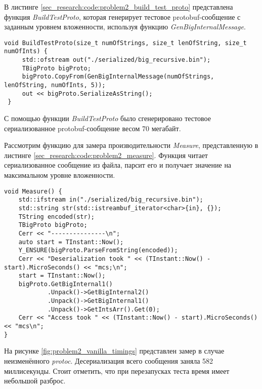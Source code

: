 В листинге \ref{sec_research:code:problem2_build_test_proto} представлена функция \textit{BuildTestProto}, которая генерирует тестовое protobuf-сообщение с заданным уровнем вложенности, используя функцию \textit{GenBigInternalMessage}.

\noindent\begin{minipage}{\linewidth}
\begin{lstlisting}[style=CodeListing, caption={Функция BuildTestProto}, label=sec_research:code:problem2_build_test_proto]
 void BuildTestProto(size_t numOfStrings, size_t lenOfString, size_t numOfInts) {
     std::ofstream out("./serialized/big_recursive.bin");
     TBigProto bigProto;
     bigProto.CopyFrom(GenBigInternalMessage(numOfStrings, lenOfString, numOfInts, 5));
     out << bigProto.SerializeAsString();
 }
\end{lstlisting}
\end{minipage}

С помощью функции \textit{BuildTestProto} было сгенерировано тестовое сериализованное protobuf-сообщение весом 70 мегабайт.

Рассмотрим функцию для замера производительности \textit{Measure}, представленную в листинге \ref{sec_research:code:problem2_measure}.
Функция читает сериализованное сообщение из файла, парсит его и получает значение на максимальном уровне вложенности.

\noindent\begin{minipage}{\linewidth}
\begin{lstlisting}[style=CodeListing, caption={Функция Measure}, label=sec_research:code:problem2_measure]
void Measure() {
    std::ifstream in("./serialized/big_recursive.bin");
    std::string str(std::istreambuf_iterator<char>{in}, {});
    TString encoded(str);
    TBigProto bigProto;
    Cerr << "---------------\n";
    auto start = TInstant::Now();
    Y_ENSURE(bigProto.ParseFromString(encoded));
    Cerr << "Deserialization took " << (TInstant::Now() - start).MicroSeconds() << "mcs;\n";
    start = TInstant::Now();
    bigProto.GetBigInternal1()
            .Unpack()->GetBigInternal2()
            .Unpack()->GetBigInternal1()
            .Unpack()->GetIntsArr().Get(0);
    Cerr << "Access took " << (TInstant::Now() - start).MicroSeconds() << "mcs\n";
}
\end{lstlisting}
\end{minipage}

На рисунке \ref{fig:problem2_vanilla_timings} представлен замер в случае неизменённого \textit{protoc}.
Десериализация всего сообщения заняла 582 миллисекунды. Стоит отметить, что при перезапусках теста время имеет небольшой разброс.


